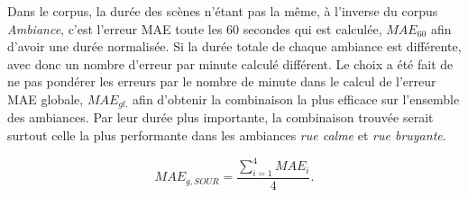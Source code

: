 Dans le corpus, la durée des scènes n'étant pas la même, à l'inverse du corpus \textit{Ambiance}, c'est l'erreur MAE toute les 60 secondes qui est calculée, $MAE_{60}$ afin d'avoir une durée normalisée. Si la durée totale de chaque ambiance est différente, avec donc un nombre d'erreur par minute calculé différent. Le choix a été fait de ne pas pondérer les erreurs par le nombre de minute dans le calcul de l'erreur MAE globale, $MAE_{gl.}$ afin d'obtenir la combinaison la plus efficace sur l'ensemble des ambiances. Par leur durée plus importante, la combinaison trouvée serait surtout celle la plus performante dans les ambiances \textit{rue calme} et \textit{rue bruyante}.

\begin{equation}
MAE_{g, SOUR} = \frac{\sum_{i = 1}^4 MAE_i}{4}.
\end{equation}


